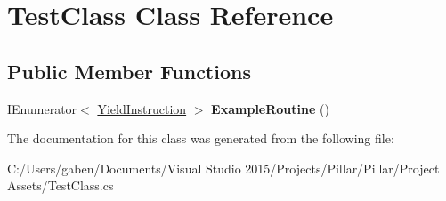 \hypertarget{class_test_class}{}\section{Test\+Class Class Reference}
\label{class_test_class}
\subsection*{Public Member Functions}
\begin{DoxyCompactItemize}
\item 
\mbox{\label{class_test_class_a898cc2b04d72c863aba09740f8843807}} 
I\+Enumerator$<$ \hyperlink{class_pillar3_d_1_1_yield_instruction}{Yield\+Instruction} $>$ {\bfseries Example\+Routine} ()
\end{DoxyCompactItemize}


The documentation for this class was generated from the following file\+:\begin{DoxyCompactItemize}
\item 
C\+:/\+Users/gaben/\+Documents/\+Visual Studio 2015/\+Projects/\+Pillar/\+Pillar/\+Project Assets/Test\+Class.\+cs\end{DoxyCompactItemize}
